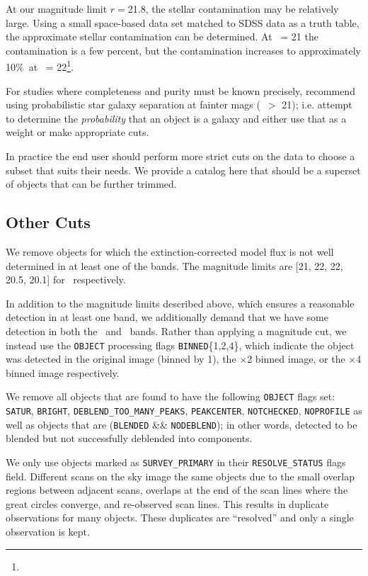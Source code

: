 \documentclass[preprint]{aastex}
\newcommand{\rmax}{21.8}
\newcommand{\contamworst}{10\%}
\begin{document}
At our magnitude limit $r = $\rmax, the stellar contamination may be relatively
large.  Using a small space-based data set matched to SDSS data as a truth
table, the approximate stellar contamination can be determined.  At \rmag\ = 21
the contamination is a few percent, but the contamination increases to
approximately \contamworst\ at \rmag\ = 22\footnote{\DRsevsg}.  

For studies where completeness and purity must be known precisely,
\citet{ScrantonMag05} recommend using probabilistic star galaxy separation at
fainter mags (\rmag\ $ > $ 21); i.e.  attempt to determine the {\it
probability} that an object is a galaxy and either use that as a weight or make
appropriate cuts. 


In practice the end user should perform more strict cuts on the data to choose
a subset that suits their needs.  We provide a catalog here that should be a
superset of objects that can be further trimmed.

\subsection{Other Cuts}

We remove objects for which the extinction-corrected model flux is not well
determined in at least one of the bands.  The magnitude limits are [21, 22, 22,
20.5, 20.1] for \allmag\ respectively.

In addition to the magnitude limits described above, which ensures a reasonable
detection in at least one band, we additionally demand that we have some
detection in both the \rmag\ and \imag\ bands.  Rather than applying a
magnitude cut, we instead use the \texttt{OBJECT} processing flags
\texttt{BINNED}\{1,2,4\}, which indicate the object was detected in the
original image (binned by 1), the $\times$2 binned image, or the $\times$4
binned image respectively.

We remove all objects that are found to have the following \texttt{OBJECT}
flags set: \texttt{SATUR}, \texttt{BRIGHT}, \texttt{DEBLEND\_TOO\_MANY\_PEAKS},
\texttt{PEAKCENTER}, \texttt{NOTCHECKED}, \texttt{NOPROFILE} as well as objects
that are (\texttt{BLENDED} \&\& \texttt{NODEBLEND}); in other words, detected
to be blended but not successfully deblended into components. 

We only use objects marked as \texttt{SURVEY\_PRIMARY} in their
\texttt{RESOLVE\_STATUS} flags field. Different scans on the
sky image the same objects due to the small overlap regions between adjacent
scans, overlaps at the end of the scan lines where the great circles converge,
and re-observed scan lines.  This results in duplicate observations for many
objects.  These duplicates are ``resolved'' and only a single observation is
kept.
\end{document}
